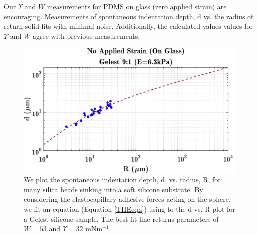 Our $ \Upsilon $ and $ W $ measurements for PDMS on glass (zero applied strain) are encouraging. Measurements of spontaneous indentation depth, d vs. the radius of return solid fits with minimal noise. Additionally, the calculated values values for $ \Upsilon $ and $ W $ agree with previous measurements. 

\begin{figure}[h!]
	\centering
	\includegraphics[width=\linewidth]{Chapters/Figures/w_ups_fit_G9-1}
	\caption[Gelest W-$\Upsilon$ Fit]{We plot the spontaneous indentation depth, d, vs. radius, R, for many silica beads sinking into a soft silicone substrate. By considering the elastocapillary adhesive forces acting on the sphere, we fit an equation (Equation \ref{THEeqn}) using to the d vs. R plot for a Gelest silicone sample. The best fit line returns parameters of $ W=53 $  and $ \Upsilon=32 $ mNm$^{-1}$.}
	\label{fig:wupsfitg9-1}
\end{figure}

